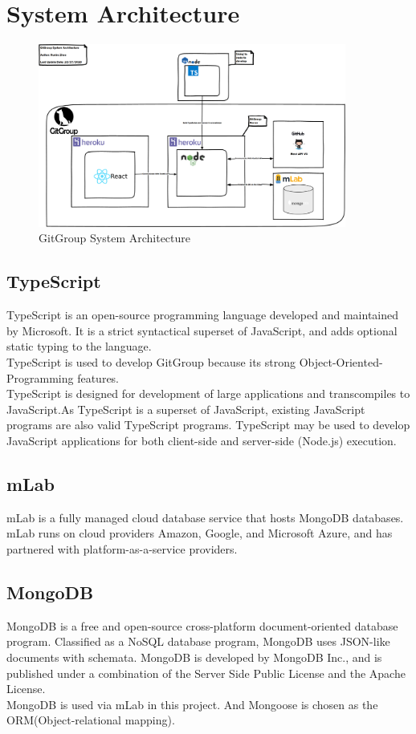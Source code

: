 \documentclass[12pt,a4paper]{report}
\begin{document}
\chapter{System Architecture}
\begin{figure}[H]
	\centering
	\includegraphics[width=0.9\textwidth]{./pics/SystemArchitecture.png}
	\caption{GitGroup System Architecture}
\end{figure}
\section{TypeScript}
TypeScript is an open-source programming language developed and maintained by Microsoft. It is a strict syntactical superset of JavaScript, and adds optional static typing to the language. \\
TypeScript is used to develop GitGroup because its strong Object-Oriented-Programming features.\\
TypeScript is designed for development of large applications and transcompiles to JavaScript.As TypeScript is a superset of JavaScript, existing JavaScript programs are also valid TypeScript programs. TypeScript may be used to develop JavaScript applications for both client-side and server-side (Node.js) execution.\\
\section{mLab}
mLab is a fully managed cloud database service that hosts MongoDB databases. mLab runs on cloud providers Amazon, Google, and Microsoft Azure, and has partnered with platform-as-a-service providers. 
\section{MongoDB}
MongoDB is a free and open-source cross-platform document-oriented database program. Classified as a NoSQL database program, MongoDB uses JSON-like documents with schemata. MongoDB is developed by MongoDB Inc., and is published under a combination of the Server Side Public License and the Apache License. 
\\
MongoDB is used via mLab in this project. And Mongoose is chosen as the ORM(Object-relational mapping).
\end{document}
